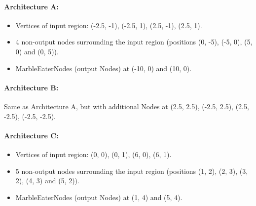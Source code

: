 \paragraph{Architecture A:}
\begin{itemize}
	\item Vertices of input region: (-2.5, -1), (-2.5, 1), (2.5, -1), (2.5, 1).
	\item 4 non-output nodes surrounding the input region (positions (0, -5), (-5, 0), (5, 0) and (0, 5)).
	\item MarbleEaterNodes (output Nodes) at (-10, 0) and (10, 0).
\end{itemize}

\paragraph{Architecture B:}
Same as Architecture A, but with additional Nodes at (2.5, 2.5), (-2.5, 2.5), (2.5, -2.5), (-2.5, -2.5).

\paragraph{Architecture C:}
\begin{itemize}
	\item Vertices of input region: (0, 0), (0, 1), (6, 0), (6, 1).
	\item 5 non-output nodes surrounding the input region (positions (1, 2), (2, 3), (3, 2), (4, 3) and (5, 2)).
	\item MarbleEaterNodes (output Nodes) at (1, 4) and (5, 4).
\end{itemize}

